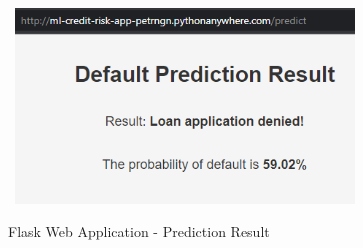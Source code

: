 \begin{figure}[H]
    \centering
    \caption{Flask Web Application - Prediction Result}\vspace{0.5em}
    \label{fig:shap}\
    \includegraphics[width=90mm]{Figures/flask_app_result.jpg}

    \vspace{-1em}
\end{figure}
